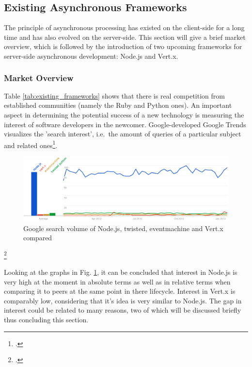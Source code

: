 \subsection{Existing Asynchronous Frameworks}
\label{existing_frameworks}
The principle of asynchronous processing has existed on the client-side for a long time and has also evolved
on the server-side. This section will give a brief market overview, which is followed by the
introduction of two upcoming frameworks for server-side asynchronous
development: Node.js and Vert.x.


\subsubsection{Market Overview}
\label{frameworks_overview}
\FloatBarrier
Table \ref{tab:existing_frameworks} shows that there is real competition
from established communities (namely the Ruby and Python ones). An important
aspect in determining the potential success of a new technology is measuring the
interest of software developers in the newcomer. Google-developed Google Trends
visualizes the 'search interest', i.e.\ the amount of queries of a particular
subject and related ones\footcite[Cf.][]{g_trends}.


\begin{figure}[hbtp]
\centering
\includegraphics[width=\textwidth]{img/googletrend_all.png}
\caption[Google search volume of Node.js, twisted, eventmachine and Vert.x compared]{Google search volume of Node.js, twisted, eventmachine and Vert.x compared}
\label{img_googletrend_all}
\end{figure}
\footcitetext[Cf.][]{g_trends}

Looking at the graphs in Fig. \ref{img_googletrend_all}, it can be
concluded that interest in Node.js is very high at the moment in absolute terms as well
as in relative terms when comparing it to peers at the same point in there lifecycle.
Interest in Vert.x is comparably low, considering that it's idea is very similar to Node.js.
The gap in interest could be related to many reasons, two of which will be discussed 
briefly thus concluding this section.

